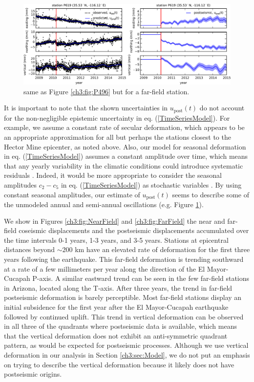 \begin{figure}
\noindent\includegraphics[scale=1.0]{ch3/figures/2016jb013114-p03}
\centering
\caption{same as Figure \ref{ch3:fig:P496} but for a far-field station.} 
\label{ch3:fig:P619}
\end{figure}

It is important to note that the shown uncertainties in $u_\mathrm{post}(t)$ do not account for the non-negligible epistemic uncertainty in eq. (\ref{TimeSeriesModel}).  For example, we assume a constant rate of secular deformation, which appears to be an appropriate approximation for all but perhaps the stations closest to the Hector Mine epicenter, as noted above.  Also, our model for seasonal deformation in eq. (\ref{TimeSeriesModel}) assumes a constant amplitude over time, which means that any yearly variability in the climatic conditions could introduce systematic residuals \citep{Davis2012}. Indeed, it would be more appropriate to consider the seasonal amplitudes $c_2-c_5$ in eq. (\ref{TimeSeriesModel}) as stochastic variables \citep{Murray2005}. By using constant seasonal amplitudes, our estimate of $u_\mathrm{post}(t)$ seems to describe some of the unmodeled annual and semi-annual oscillations (e.g. Figure \ref{ch3:fig:P619}).          

We show in Figures \ref{ch3:fig:NearField} and \ref{ch3:fig:FarField} the near and far-field coseismic displacements and the postseismic displacements accumulated over the time intervals 0-1 years, 1-3 years, and 3-5 years.  Stations at epicentral distances beyond ${\sim}200$ km have an elevated rate of deformation for the first three years following the earthquake.  This far-field deformation is trending southward at a rate of a few millimeters per year along the direction of the El Mayor-Cucapah P-axis.  A similar eastward trend can be seen in the few far-field stations in Arizona, located along the T-axis.  After three years, the trend in far-field postseismic deformation is barely perceptible.  Most far-field stations display an initial subsidence for the first year after the El Mayor-Cucapah earthquake followed by continued uplift.  This trend in vertical deformation can be observed in all three of the quadrants where postseismic data is available, which means that the vertical deformation does not exhibit an anti-symmetric quadrant pattern, as would be expected for postseismic processes.  Although we use vertical deformation in our analysis in Section \ref{ch3:sec:Model},  we do not put an emphasis on trying to describe the vertical deformation because it likely does not have postseismic origins.        

